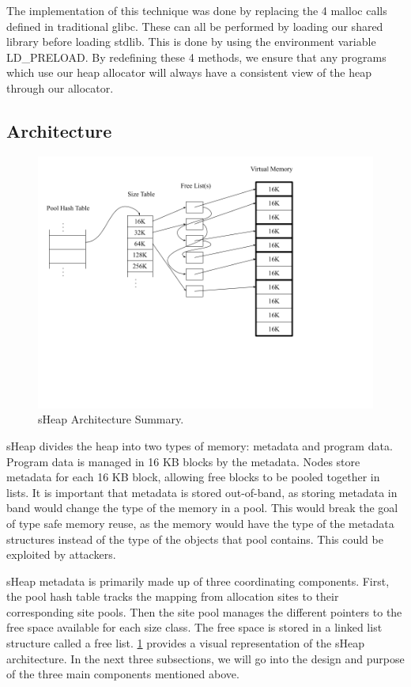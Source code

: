 \documentclass[conference]{IEEEtran}
\begin{document}
The implementation of this technique was done by replacing the 4 malloc 
calls defined in traditional glibc. These can all be performed by loading 
our shared library before loading stdlib. This is done by using the 
environment variable LD\_PRELOAD. By redefining these 4 methods, we ensure 
that any programs which use our heap allocator will always have a 
consistent view of the heap through our allocator.

\subsection{Architecture}

\begin{figure}[htbp]
  \centering
  \includegraphics[width=\linewidth]{sheap_model.png}
  \caption{sHeap Architecture Summary.}
  \label{fig:sheap-model}
\end{figure}

sHeap divides the heap into two types of memory: metadata and program data.  Program data is managed in 16 KB blocks by the metadata.  Nodes store metadata for each 16 KB block, allowing free blocks to be pooled together in lists.  It is important that metadata is stored out-of-band, as storing metadata in band would change the type of the memory in a pool. This would break the goal of type safe memory reuse, as the memory would have the type of the metadata structures instead of the type of the objects that pool contains.  This could be exploited by attackers.  

sHeap metadata is primarily made up of three coordinating components. First, the 
pool hash table tracks the mapping from allocation sites to their 
corresponding site pools. Then the site pool manages the different pointers 
to the free space available for each size class. The free space is stored 
in a linked list structure called a free list. \ref{fig:sheap-model} 
provides a visual representation of the sHeap architecture. In the next 
three subsections, we will go into the design and purpose of the three 
main components mentioned above.
\end{document}
